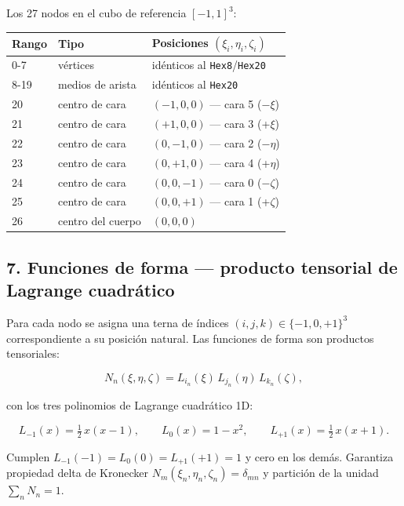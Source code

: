 \documentclass[11pt,letterpaper,oneside]{report}
\begin{document}
Los 27 nodos en el cubo de referencia $[-1, 1]^3$:

\begin{center}
\begin{tabularx}{\textwidth}{YYY}
\hline
\textbf{Rango} & \textbf{Tipo} & \textbf{Posiciones $(\xi_i, \eta_i, \zeta_i)$} \\
-7 & vértices & idénticos al \texttt{Hex8}/\texttt{Hex20} \\
8-19 & medios de arista & idénticos al \texttt{Hex20} \\
20 & centro de cara & $(-1, 0, 0)$ --- cara 5 (−\ensuremath{\xi}) \\
21 & centro de cara & $(+1, 0, 0)$ --- cara 3 (+\ensuremath{\xi}) \\
22 & centro de cara & $(0, -1, 0)$ --- cara 2 (−\ensuremath{\eta}) \\
23 & centro de cara & $(0, +1, 0)$ --- cara 4 (+\ensuremath{\eta}) \\
24 & centro de cara & $(0, 0, -1)$ --- cara 0 (−\ensuremath{\zeta}) \\
25 & centro de cara & $(0, 0, +1)$ --- cara 1 (+\ensuremath{\zeta}) \\
26 & centro del cuerpo & $(0, 0, 0)$ \\
\hline
\end{tabularx}
\end{center}
\subsection{7. Funciones de forma --- producto tensorial de Lagrange cuadrático}

Para cada nodo se asigna una terna de índices $(i, j, k) \in \{-1, 0, +1\}^3$ correspondiente a su posición natural. Las funciones de forma son productos tensoriales:

\[
N_n(\xi, \eta, \zeta) = L_{i_n}(\xi)\,L_{j_n}(\eta)\,L_{k_n}(\zeta),
\]

con los tres polinomios de Lagrange cuadrático 1D:

\[
L_{-1}(x) = \tfrac{1}{2}\,x(x - 1),\qquad L_0(x) = 1 - x^2,\qquad L_{+1}(x) = \tfrac{1}{2}\,x(x + 1).
\]

Cumplen $L_{-1}(-1) = L_0(0) = L_{+1}(+1) = 1$ y cero en los demás. Garantiza propiedad delta de Kronecker $N_m(\xi_n, \eta_n, \zeta_n) = \delta_{mn}$ y partición de la unidad $\sum_n N_n = 1$.
\end{document}
